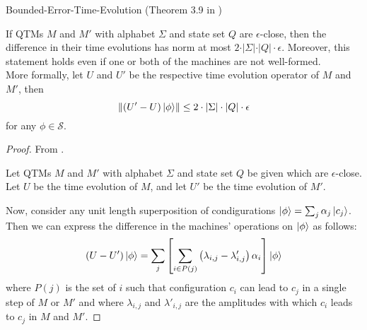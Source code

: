 \begin{theorem}
\label{th:bete}
Bounded-Error-Time-Evolution (Theorem 3.9 in \cite{bernstein_vazirani_1997})

If \acp{QTM} $M$ and $M'$ with alphabet $\Sigma$ and state set $Q$ are $\epsilon$-close, then the difference in their time evolutions has norm at most $2\cdot\vert\Sigma\vert\cdot\vert Q\vert\cdot\epsilon$.
Moreover, this statement holds even if one or both of the machines are not well-formed.
\\
More formally, let $U$ and $U'$ be the respective time evolution operator of $M$ and $M'$, then
\begin{equation}
    \left\lVert(U'-U)\ket{\phi}\right\rVert
    \leq 2\cdot\vert\Sigma\vert\cdot\vert Q\vert\cdot\epsilon
\end{equation}
for any $\phi\in\mathcal{S}$.

\begin{proof}
From \cite{bernstein_vazirani_1997}.

Let \acp{QTM} $M$ and $M'$ with alphabet $\Sigma$ and state set $Q$ be given which are $\epsilon$-close. Let $U$ be the time evolution of $M$, and let $U'$ be the time evolution of $M'$.

Now, consider any unit length superposition of condigurations $\ket{\phi}=\sum_j\alpha_j\ket{c_j}$.
Then we can express the difference in the machines' operations on $\ket{\phi}$ as follows:
\begin{equation}
    (U-U')\ket{\phi}
    =\sum_j\left[\sum_{i\in P(j)}\left(\lambda_{i,j}-\lambda'_{i,j}\right)\alpha_i\right]\ket{\phi}
\end{equation}
where $P(j)$ is the set of $i$ such that configuration $c_i$ can lead to $c_j$ in a single step of $M$ or $M'$ and where $\lambda_{i,j}$ and $\lambda'_{i,j}$ are the amplitudes with which $c_i$ leads to $c_j$ in $M$ and $M'$.


\end{proof}
\end{theorem}
